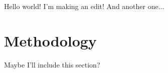 \documentclass{article}
\begin{document}
Hello world! I'm making an edit! And another one...

\section{Methodology}

Maybe I'll include this section?
\end{document}
